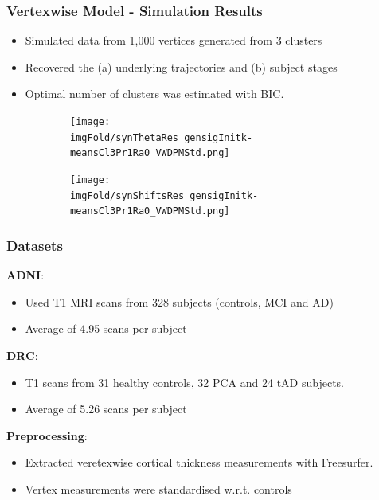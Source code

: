 \documentclass[10pt,xcolor=table]{beamer}
\begin{document}
\begin{frame}
\frametitle{Vertexwise Model - Simulation Results}

\begin{itemize}
 \item Simulated data from 1,000 vertices generated from 3 clusters
 \item Recovered the (a) underlying trajectories and (b) subject stages
 \item Optimal number of clusters was estimated with BIC.
\end{itemize}


\newcommand{\imgFold}{../images/vwdpm}

\begin{figure}
\begin{subfigure}[b]{0.75\textwidth}
  \hspace{-1em}
  \texttt{[image: \\imgFold/synThetaRes\_gensigInitk-meansCl3Pr1Ra0\_VWDPMStd.png]}
  \caption{}
  \label{fig:synThetaRes}
\end{subfigure}
\hspace{-2em}
\begin{subfigure}[b]{0.24\textwidth}
\centering
  \texttt{[image: \\imgFold/synShiftsRes\_gensigInitk-meansCl3Pr1Ra0\_VWDPMStd.png]}
  \vspace{0.9em}
  \caption{}
  \label{fig:synShiftRes}
\end{subfigure}
\end{figure}
\end{frame}

\begin{frame}
\frametitle{Datasets}

\textbf{ADNI}:
\begin{itemize}
 \item Used T1 MRI scans from 328 subjects (controls, MCI and AD)
 \item Average of 4.95 scans per subject
\end{itemize}

\vspace{2em}

\textbf{DRC}:
\begin{itemize}
 \item T1 scans from 31 healthy controls, 32 PCA and 24 tAD subjects.
 \item Average of 5.26 scans per subject
\end{itemize}

\vspace{2em}

\textbf{Preprocessing}:
\begin{itemize}
 \item Extracted veretexwise cortical thickness measurements with Freesurfer.
 \item Vertex measurements were standardised w.r.t. controls
\end{itemize}



\end{frame}
\end{document}
